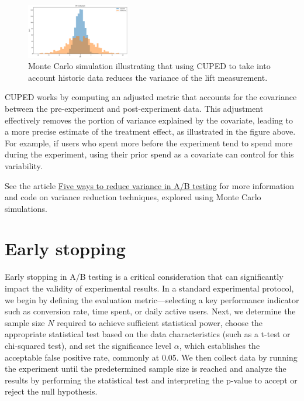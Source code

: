 \documentclass[final,5p,times,twocolumn,authoryear]{elsarticle}
\begin{document}
\begin{figure}[h]
  \centering 
  \includegraphics[width=0.4\textwidth]{fig-3.png}  
  \caption{Monte Carlo simulation illustrating that using CUPED to take into account historic data reduces the variance of the lift measurement.} 
\end{figure}

CUPED works by computing an adjusted metric that accounts for the covariance between the pre-experiment and post-experiment data. This adjustment effectively removes the portion of variance explained by the covariate, leading to a more precise estimate of the treatment effect, as illustrated in the figure above. For example, if users who spent more before the experiment tend to spend more during the experiment, using their prior spend as a covariate can control for this variability.

See the article \href{https://bytepawn.com/five-ways-to-reduce-variance-in-ab-testing.html}{Five ways to reduce variance in A/B testing} for more information and code on variance reduction techniques, explored using Monte Carlo simulations.

\section{Early stopping}

Early stopping in A/B testing is a critical consideration that can significantly impact the validity of experimental results. In a standard experimental protocol, we begin by defining the evaluation metric—selecting a key performance indicator such as conversion rate, time spent, or daily active users. Next, we determine the sample size $ N $ required to achieve sufficient statistical power, choose the appropriate statistical test based on the data characteristics (such as a t-test or chi-squared test), and set the significance level $ \alpha $, which establishes the acceptable false positive rate, commonly at 0.05. We then collect data by running the experiment until the predetermined sample size is reached and analyze the results by performing the statistical test and interpreting the p-value to accept or reject the null hypothesis.
\end{document}
